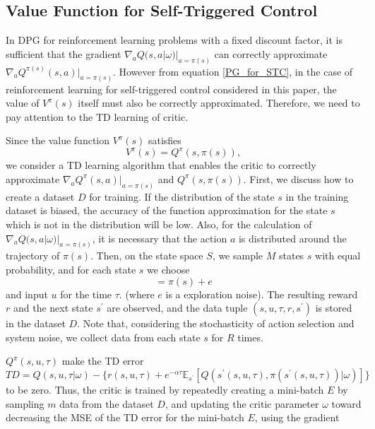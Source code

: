 \documentclass[english, dvipdfmx]{ampmt}             %
\newcommand{\expect}{\mathbb{E}}
\begin{document}
\subsection{Value Function for Self-Triggered Control}
In DPG for reinforcement learning problems with a fixed discount factor, it is sufficient that the gradient $\nabla_aQ(s,a|\omega)|_{a=\pi(s)}$ can correctly approximate $\nabla_aQ^{\pi(s)}(s,a)|_{a=\pi(s)}$. However from equation \eqref{PG_for_STC}, in the case of reinforcement learning for self-triggered control considered in this paper, the value of $V^{\pi}(s)$ itself must also be correctly approximated. Therefore, we need to pay attention to the TD learning of critic.\par
Since the value function $V^{\pi}(s)$ satisfies 
\begin{equation}
	V^{\pi}(s) = Q^{\pi}(s,\pi(s)),
\end{equation}
we consider a TD learning algorithm that enables the critic to correctly approximate $\nabla_aQ^{\pi}(s,a)|_{a=\pi(s)}$ and $Q^{\pi}(s,\pi(s))$. First, we discuss how to create a dataset $D$ for training. If the distribution of the state $s$ in the training dataset is biased, the accuracy of the function approximation for the state $s$ which is not in the distribution will be low. Also, for the calculation of $\nabla_aQ(s,a|\omega)|_{a=\pi(s)}$, it is necessary that the action $a$ is distributed around the trajectory of $\pi(s)$. Then, on the state space $S$, we sample $M$ states $s$ with equal probability, and for each state $s$ we choose 
\begin{equation}
	[u, \tau] = \pi(s) + e
\end{equation}
and input $u$ for the time $\tau$. (where $e$ is a exploration noise). The resulting reward $r$ and the next state $s^{\prime}$ are observed, and the data tuple $(s,u,\tau,r,s^{\prime})$ is stored in the dataset $D$. Note that, considering the stochasticity of action selection and system noise, we collect data from each state $s$ for $R$ times.\par
$Q^{\pi}(s,u, \tau)$ make the TD error
\begin{equation}
	TD = Q(s,u,\tau|\omega) - \{r(s,u,\tau) + e^{-\alpha\tau}\expect_{s^{\prime}}[Q(s^{\prime}(s,u,\tau), \pi(s^{\prime}(s,u,\tau))|\omega)]\}
\end{equation} 
to be zero. Thus, the critic is trained by repeatedly creating a mini-batch $E$ by sampling $m$ data from the dataset $D$, and updating the critic parameter $\omega$ toward decreasing the MSE of the TD error for the mini-batch $E$, using the gradient
\end{document}
